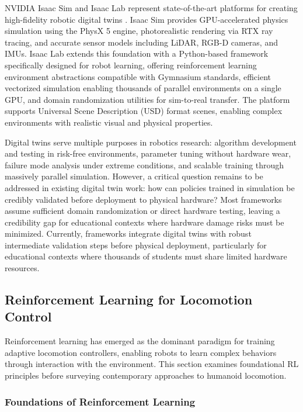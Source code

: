\documentclass[12pt,a4paper]{article}
\begin{document}
NVIDIA Isaac Sim and Isaac Lab represent state-of-the-art platforms for creating high-fidelity robotic digital twins \parencite{nvidia2024isaac, nvidia2024isaaclab}. Isaac Sim provides GPU-accelerated physics simulation using the PhysX 5 engine, photorealistic rendering via RTX ray tracing, and accurate sensor models including LiDAR, RGB-D cameras, and IMUs. Isaac Lab extends this foundation with a Python-based framework specifically designed for robot learning, offering reinforcement learning environment abstractions compatible with Gymnasium standards, efficient vectorized simulation enabling thousands of parallel environments on a single GPU, and domain randomization utilities for sim-to-real transfer. The platform supports Universal Scene Description (USD) format scenes, enabling complex environments with realistic visual and physical properties.

Digital twins serve multiple purposes in robotics research: algorithm development and testing in risk-free environments, parameter tuning without hardware wear, failure mode analysis under extreme conditions, and scalable training through massively parallel simulation. However, a critical question remains to be addressed in existing digital twin work: how can policies trained in simulation be credibly validated before deployment to physical hardware? Most frameworks assume sufficient domain randomization or direct hardware testing, leaving a credibility gap for educational contexts where hardware damage risks must be minimized. Currently, frameworks integrate digital twins with robust intermediate validation steps before physical deployment, particularly for educational contexts where thousands of students must share limited hardware resources.

\subsection{Reinforcement Learning for Locomotion Control}

Reinforcement learning has emerged as the dominant paradigm for training adaptive locomotion controllers, enabling robots to learn complex behaviors through interaction with the environment. This section examines foundational RL principles before surveying contemporary approaches to humanoid locomotion.

\subsubsection{Foundations of Reinforcement Learning}
\end{document}
